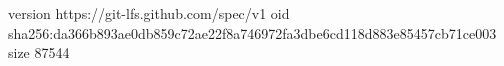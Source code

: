 version https://git-lfs.github.com/spec/v1
oid sha256:da366b893ae0db859c72ae22f8a746972fa3dbe6cd118d883e85457cb71ce003
size 87544
